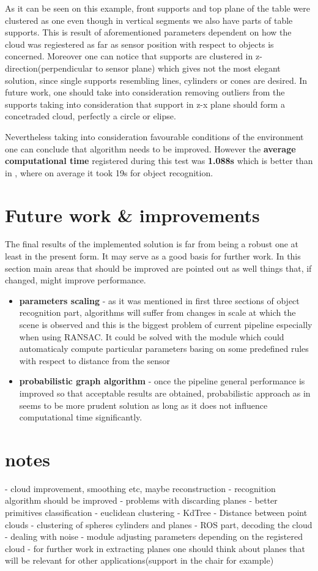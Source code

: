 \documentclass[12pt,oneside]{amsart}
\begin{document}
As it can be seen on this example, front supports and top plane of the table were clustered as one even though in vertical segments we also have parts of table supports. This is result of aforementioned parameters dependent on how the cloud was regiestered as far as sensor position with respect to objects is concerned. Moreover one can notice that supports are clustered in z-direction(perpendicular to sensor plane) which gives not the most elegant solution, since single supports  resembling lines, cylinders or cones are desired. In future work, one should take into consideration removing outliers from the supports taking into consideration that support in z-x plane should form a concetraded cloud, perfectly a circle or elipse. 

 Nevertheless taking into consideration favourable conditions of the environment one can conclude that algorithm needs to be improved. However the \textbf{average computational time} registered during this test was \textbf{1.088s} which is better than in \cite{pap1}, where on average it took 19s for object recognition.
\section{Future work \& improvements}
The final results of the implemented solution is far from being a robust one at least in the present form. It may serve as a good basis for further work. In this section main areas that should be improved are pointed out as well things that, if changed, might improve performance.
\begin{itemize}
  \item \textbf{parameters scaling} - as it was mentioned in first three sections of object recognition part, algorithms will suffer from changes in scale at which the scene is observed and this is the biggest problem of current pipeline especially when using RANSAC. It could be solved with the module which could automaticaly compute particular parameters basing on some predefined rules with respect to distance from the sensor
  \item \textbf{probabilistic graph algorithm} - once the pipeline general performance is improved so that acceptable results are obtained, probabilistic approach as in \cite{pap1} seems to be more prudent solution as long as it does not influence computational time significantly.
\end{itemize}

\section{notes}
- cloud improvement, smoothing etc, maybe reconstruction
- recognition algorithm should be improved
- problems with discarding planes 
- better primitives classification
- euclidean clustering
- KdTree
- Distance between point clouds
- clustering of spheres cylinders and planes
- ROS part, decoding the cloud
- dealing with noise
- module adjusting parameters depending on the registered cloud
- for further work in extracting planes one should think about planes that will be relevant for other applications(support in the chair for example)
\end{document}
